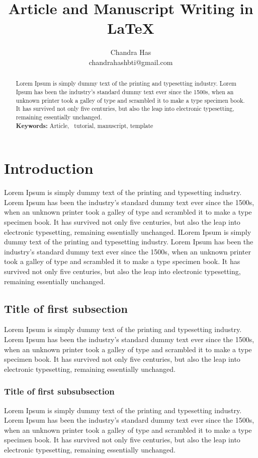\documentclass[10pt, a4paper]{article}
\title{\vspace{-15mm} Article and Manuscript Writing in \LaTeX}
\author{Chandra Has\\ chandrahashbti@gmail.com}
\begin{document}
\maketitle

\begin{abstract}
	Lorem Ipsum is simply dummy text of the printing and typesetting industry. Lorem Ipsum has been the industry's standard dummy text ever since the 1500s, when an unknown printer took a galley of type and scrambled it to make a type specimen book. It has survived not only five centuries, but also the leap into electronic typesetting, remaining essentially unchanged. \\
	
	\noindent
	\textbf{Keywords:} Article, \LaTeXe\ tutorial, manuscript, template
\end{abstract}


\section{Introduction}
Lorem Ipsum is simply dummy text of the printing and typesetting industry. Lorem Ipsum has been the industry's standard dummy text ever since the 1500s, when an unknown printer took a galley of type and scrambled it to make a type specimen book. It has survived not only five centuries, but also the leap into electronic typesetting, remaining essentially unchanged. ILorem Ipsum is simply dummy text of the printing and typesetting industry. Lorem Ipsum has been the industry's standard dummy text ever since the 1500s, when an unknown printer took a galley of type and scrambled it to make a type specimen book. It has survived not only five centuries, but also the leap into electronic typesetting, remaining essentially unchanged.

\subsection{Title of first subsection}
Lorem Ipsum is simply dummy text of the printing and typesetting industry. Lorem Ipsum has been the industry's standard dummy text ever since the 1500s, when an unknown printer took a galley of type and scrambled it to make a type specimen book. It has survived not only five centuries, but also the leap into electronic typesetting, remaining essentially unchanged.

\subsubsection{Title of first subsubsection}
Lorem Ipsum is simply dummy text of the printing and typesetting industry. Lorem Ipsum has been the industry's standard dummy text ever since the 1500s, when an unknown printer took a galley of type and scrambled it to make a type specimen book. It has survived not only five centuries, but also the leap into electronic typesetting, remaining essentially unchanged.
\end{document}
